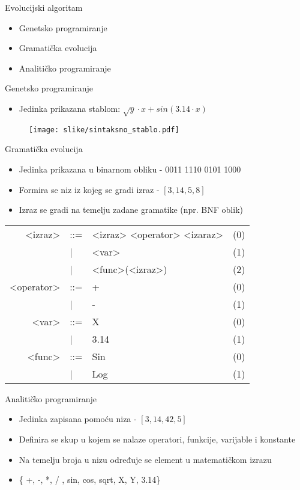 \documentclass[utf8]{beamer}
\begin{document}
\begin{frame}{Evolucijski algoritam}
	\begin{itemize}
	\item Genetsko programiranje
	\pause
	\item Gramatička evolucija
	\pause
	\item Analitičko programiranje
	\end{itemize}
\end{frame}


\begin{frame}{Genetsko programiranje}
	\begin{itemize}
		\item Jedinka prikazana stablom: $\sqrt{y} \cdot x+sin(3.14\cdot x)$
	\end{itemize}
	\begin{figure}
		\centering
		\texttt{[image: slike/sintaksno\_stablo.pdf]}
	\end{figure}
\end{frame}

\begin{frame}{Gramatička evolucija}
	\begin{itemize}
		\item Jedinka prikazana u binarnom obliku - 0011 1110 0101 1000
		\item Formira se niz iz kojeg se gradi izraz - $[3, 14, 5, 8]$
		\item Izraz se gradi na temelju zadane gramatike (npr. BNF oblik)
	\end{itemize}
\pause
\begin{tabular}{r l l c}                       
	<izraz> & ::= & <izraz> <operator> <izaraz> & (0)\\
	  & | & <var> & (1)\\
	  & | & <func>(<izraz>) & (2)\\
	 <operator> & ::= & + & (0)\\
	  & | & - & (1)\\
	<var> & ::= & X & (0)\\
	& | & 3.14 & (1)\\
	<func> & ::= & Sin & (0)\\
	& | & Log & (1)\\
\end{tabular}

\end{frame}

\begin{frame}{Analitičko programiranje}
	\begin{itemize}
		\item Jedinka zapisana pomoću niza - $[3, 14, 42, 5]$
		\item Definira se skup u kojem se nalaze operatori, funkcije, varijable i konstante
		\item Na temelju broja u nizu određuje se element u matematičkom izrazu
		\item \{ +, -, *, / , sin, cos, sqrt, X, Y, 3.14\}
 
	\end{itemize}
\end{frame}
\end{document}
